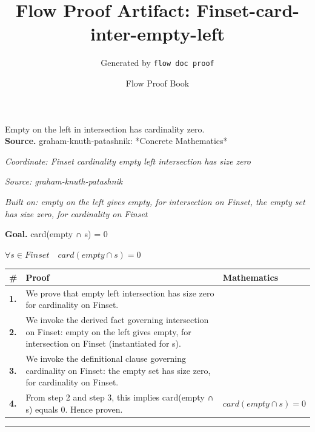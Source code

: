 \documentclass[11pt]{article}
\title{Flow Proof Artifact: Finset-card-inter-empty-left}
\author{Generated by \texttt{flow doc proof}}
\date{Flow Proof Book}
\theoremstyle{definition}
\begin{document}
\maketitle
Empty on the left in intersection has cardinality zero.\\[0.5em]
\textbf{Source.} graham-knuth-patashnik: *Concrete Mathematics*\\[0.5em]
\bigskip
{}\par
\smallskip\noindent\textit{Coordinate: Finset \cdot cardinality \cdot empty left intersection has size zero}\par
\smallskip\noindent\textit{Source: graham-knuth-patashnik}\par
\smallskip\noindent\textit{Built on: empty on the left gives empty, for intersection on Finset, the empty set has size zero, for cardinality on Finset}\par
\medskip
\noindent\textbf{Goal.} card(empty ∩ s) = 0\par
\noindent$\displaystyle \forall s \in Finset\quad card(empty ∩ s) = 0$\par
\medskip
\noindent
\begin{tabular}{@{} >{\raggedright\arraybackslash}p{} >{\raggedright\arraybackslash}p{} >{\raggedleft\arraybackslash}p{} @{}}
\textbf{\#} & \textbf{Proof} & \textbf{Mathematics} \\
\midrule
\textbf{1.} & We prove that empty left intersection has size zero for cardinality on Finset. & \\[0.45em]
\textbf{2.} & We invoke the derived fact governing intersection on Finset: empty on the left gives empty, for intersection on Finset (instantiated for s). & \\[0.45em]
\textbf{3.} & We invoke the definitional clause governing cardinality on Finset: the empty set has size zero, for cardinality on Finset. & \\[0.45em]
\textbf{4.} & From step 2 and step 3, this implies card(empty ∩ s) equals 0. Hence proven. & $\displaystyle card(empty ∩ s) = 0$ \\[0.45em]
\bottomrule
\end{tabular}
\label{thm:Finset-cardinality-empty_left_intersection_has_size_zero}
\par\medskip\hrule
\end{document}
